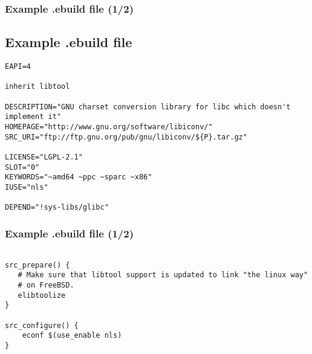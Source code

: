 \begin{frame}[fragile,t]
	\frametitle{Example .ebuild file (1/2)}
	\subsection{Example .ebuild file}
	\begin{small}
   \begin{verbatim}
EAPI=4

inherit libtool

DESCRIPTION="GNU charset conversion library for libc which doesn't implement it"
HOMEPAGE="http://www.gnu.org/software/libiconv/"
SRC_URI="ftp://ftp.gnu.org/pub/gnu/libiconv/${P}.tar.gz"

LICENSE="LGPL-2.1"
SLOT="0"
KEYWORDS="~amd64 ~ppc ~sparc ~x86"
IUSE="nls"

DEPEND="!sys-libs/glibc"
	\end{verbatim}
	\end{small}
\end{frame}
\begin{frame}[fragile,t]
	\frametitle{Example .ebuild file (1/2)}
	\begin{small}
   \begin{verbatim}

src_prepare() {
   # Make sure that libtool support is updated to link "the linux way"
   # on FreeBSD.
   elibtoolize
}

src_configure() {
    econf $(use_enable nls)
}
	\end{verbatim}
	\end{small}
\end{frame}

